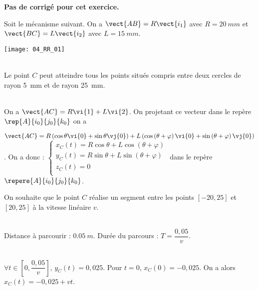 \normaltrue
\correctionfalse


\setcounter{numques}{0}
\ifcorrection
\else
\textbf{Pas de corrigé pour cet exercice.}
\fi

\ifprof
\else
Soit le mécanisme suivant. On a $\vect{AB}=R\vect{i_1}$ avec $R=\SI{20}{mm}$ et  
$\vect{BC}=L\vect{i_2}$ avec $L=\SI{15}{mm}$.
\begin{center}
\texttt{[image: 04\_RR\_01]}
\end{center}
\fi

\ifprof~\\
Le point $C$ peut atteindre tous les points situés compris entre deux cercles de rayon \SI{5}{mm} et de rayon \SI{25}{mm}.
\else
\fi

\ifprof~\\
On  a $\vect{AC}=R\vi{1}+L\vi{2}$. On projetant ce vecteur dans le repère $\rep{A}{i_0}{j_0}{k_0}$ on a 

$\vect{AC}=R\left(\cos\theta \vi{0} + \sin\theta \vj{0}\right) +L\left(\cos\left(\theta+\varphi\right) \vi{0} + \sin\left(\theta+\varphi\right) \vj{0}\right)$. On a donc :
$\left\{
\begin{array}{l}
x_C(t)= R\cos\theta  +L\cos\left(\theta+\varphi\right)  \\
y_C(t)= R \sin\theta + L\sin\left(\theta+\varphi\right)\\
z_C(t)= 0\\
\end{array}
\right.
$ dans le repère $\repere{A}{i_0}{j_0}{k_0}$.
\else
\fi

\ifprof
\else
On souhaite que le point $C$ réalise un segment entre les points $[-20,25]$ et $[20,25]$ à la vitesse linéaire $v$. 
\fi


\ifprof ~\\
Distance à parcourir : $\SI{0,05}{m}$. Durée du parcours : $T=\dfrac{0,05}{v}$.
\else
\fi


\ifprof ~\\
$\forall t \in \left[0,\dfrac{0,05}{v}\right]$, $y_C(t)=0,025$. 
Pour $t=0$, $x_C(0)=-0,025$. On a alors $x_C(t)=-0,025+vt$.  

